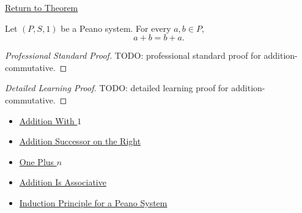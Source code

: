\newpage
{}
\label{prf:addition-commutative}

\begin{remark*}[Return]
\hyperref[thm:addition-commutative]{Return to Theorem}
\end{remark*}

\begin{theorem*}
Let $(P,S,1)$ be a Peano system. For every $a,b \in P$,
\[
a+b=b+a.
\]
\end{theorem*}

\begin{proof}[Professional Standard Proof]
\LRAProofBodyStart
TODO: professional standard proof for addition-commutative.
\end{proof}

\begin{proof}[Detailed Learning Proof]
\LRAProofBodyStart
TODO: detailed learning proof for addition-commutative.
\end{proof}

\begin{remark*}
\end{remark*}

\begin{dependencies}
\begin{itemize}
  \item \hyperref[thm:addition-with-one]{Addition With $1$}
  \item \hyperref[thm:addition-successor-on-right]{Addition Successor on the Right}
  \item \hyperref[thm:one-plus-n]{One Plus $n$}
  \item \hyperref[thm:addition-associative]{Addition Is Associative}
  \item \hyperref[thm:induction-principle-for-peano-system]{Induction Principle for a Peano System}
\end{itemize}
\end{dependencies}

\clearpage
